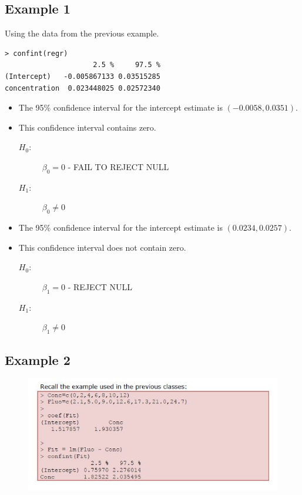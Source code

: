 \documentclass[a4paper,12pt]{article}
\begin{document}
\subsection{Example 1}
Using the data from the previous example.
\begin{framed}
\begin{verbatim}
> confint(regr)
                     2.5 %     97.5 %
(Intercept)   -0.005867133 0.03515285
concentration  0.023448025 0.02572340
\end{verbatim}
\end{framed}
\begin{itemize}
	\item The 95\% confidence interval for the intercept estimate is $(-0.0058,0.0351)$.
	\item This confidence interval contains zero.
	\begin{description}
		\item[ $H_0$:] $\beta_0= 0 $ - FAIL TO REJECT NULL
		\item[ $H_1$:] $\beta_0 \neq 0$
	\end{description}
		\item The 95\% confidence interval for the intercept estimate is $(0.0234, 0.0257)$.
		\item This confidence interval does not contain zero.
		\begin{description}
			\item[ $H_0$:] $\beta_1= 0 $ - REJECT NULL
			\item[ $H_1$:] $\beta_1 \neq 0$
		\end{description}
\end{itemize}
\newpage
\subsection{Example 2}
\begin{figure}[h!]
\centering
\includegraphics[width=1.1\linewidth]{"images/RegressionConfInt - R Code"}
\end{figure}
\end{document}

